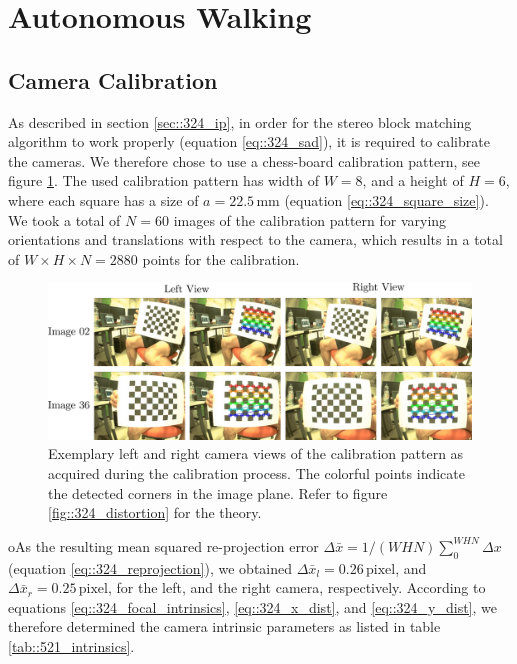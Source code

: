 \section{Autonomous Walking}
\label{sec::54_aw}
\subsection{Camera Calibration}
As described in section \ref{sec::324_ip}, in order for the stereo block matching algorithm to work properly (equation \ref{eq::324_sad}), it is required to calibrate the cameras. We therefore chose to use a chess-board calibration pattern, see figure \ref{fig::521_calib}. The used calibration pattern has width of $W=8$, and a height of $H=6$, where each square has a size of $a=22.5\,\text{mm}$ (equation \ref{eq::324_square_size}). We took a total of $N=60$ images of the calibration pattern for varying orientations and translations with respect to the camera, which results in a total of $W\times H\times N = 2880$ points for the calibration. 
\begin{figure}[h]
	\centering
	\includegraphics[scale=.28]{chapters/05_experiments/02_autonomous_walking/01_camera_calibration/calib.png}
	\caption{Exemplary left and right camera views of the calibration pattern as acquired during the calibration process. The colorful points indicate the detected corners in the image plane. Refer to figure \ref{fig::324_distortion} for the theory.}
	\label{fig::521_calib}
\end{figure}
oAs the resulting mean squared re-projection error $\Delta \bar{x} = 1/(WHN)\sum_0^{WHN} \Delta x$ (equation \ref{eq::324_reprojection}), we obtained $\Delta \bar{x}_l = 0.26\, \text{pixel}$, and $\Delta \bar{x}_r = 0.25\,\text{pixel}$, for the left, and the right camera, respectively. According to equations \ref{eq::324_focal_intrinsics}, \ref{eq::324_x_dist}, and \ref{eq::324_y_dist}, we therefore determined the camera intrinsic parameters as listed in table \ref{tab::521_intrinsics}.
